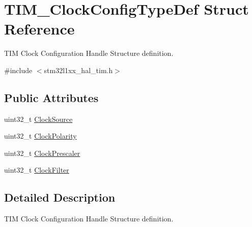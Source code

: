 \hypertarget{struct_t_i_m___clock_config_type_def}{\section{T\-I\-M\-\_\-\-Clock\-Config\-Type\-Def Struct Reference}
\label{struct_t_i_m___clock_config_type_def}
}


T\-I\-M Clock Configuration Handle Structure definition.  




{\ttfamily \#include $<$stm32l1xx\-\_\-hal\-\_\-tim.\-h$>$}

\subsection*{Public Attributes}
\begin{DoxyCompactItemize}
\item 
uint32\-\_\-t \hyperlink{struct_t_i_m___clock_config_type_def_a54c329013b5f6f87d1c3d2495fca84d2}{Clock\-Source}
\item 
uint32\-\_\-t \hyperlink{struct_t_i_m___clock_config_type_def_a66453fa8dc8a300267ff5aba08eff5c4}{Clock\-Polarity}
\item 
uint32\-\_\-t \hyperlink{struct_t_i_m___clock_config_type_def_ae4c0cb6f58da0ec7b99f1c6411d2fee1}{Clock\-Prescaler}
\item 
uint32\-\_\-t \hyperlink{struct_t_i_m___clock_config_type_def_adaf66568c766f75c4c661a872ca399e3}{Clock\-Filter}
\end{DoxyCompactItemize}


\subsection{Detailed Description}
T\-I\-M Clock Configuration Handle Structure definition. 

